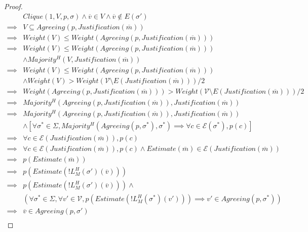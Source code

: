 \begin{proof}
\begin{align}
        &Clique(1, V, p, \sigma) \land \overline{v} \in V \land \overline{v} \notin E(\sigma') \\
\implies&V \subseteq Agreeing(p, Justification(\overline{m}))\\
\implies&Weight(V) \leq Weight(Agreeing(p, Justification(\overline{m})))\\
\implies&Weight(V) \leq Weight(Agreeing(p, Justification(\overline{m})))\\
        &\land Majority^H(V, Justification(\overline{m})) \\
\implies&Weight(V) \leq Weight(Agreeing(p, Justification(\overline{m})))\\
        &\land Weight(V) > Weight(\mathcal{V} \setminus E(Justification(\overline{m})))/2 \\
\implies&Weight(Agreeing(p, Justification(\overline{m}))) > Weight(\mathcal{V} \setminus E(Justification(\overline{m})))/2 \\
\implies&Majority^H(Agreeing(p, Justification(\overline{m})), Justification(\overline{m})) \\
\implies&Majority^H(Agreeing(p, Justification(\overline{m})), Justification(\overline{m})) \\
        &\land [\forall \sigma^* \in \Sigma, Majority^H(Agreeing(p, \sigma^*), \sigma^*) \implies \forall c \in \mathcal{E}(\sigma^*), p(c)] \\
\implies&\forall c \in \mathcal{E}(Justification(\overline{m})), p(c) \\
\implies&\forall c \in \mathcal{E}(Justification(\overline{m})), p(c) \land Estimate(\overline{m}) \in \mathcal{E}(Justification(\overline{m})) \\
\implies&p(Estimate(\overline{m})) \\
\implies&p(Estimate(!L^H_M(\sigma')(\overline{v}))) \\
\implies&p(Estimate(!L^H_M(\sigma')(\overline{v}))) \land \\
        &(\forall \sigma^* \in \Sigma, \forall v' \in \mathcal{V}, p(Estimate(!L^H_M(\sigma^*)(v'))) \implies v' \in Agreeing(p, \sigma^*)) \\
\implies&\overline{v} \in Agreeing(p, \sigma') \\
\end{align}
\end{proof}




